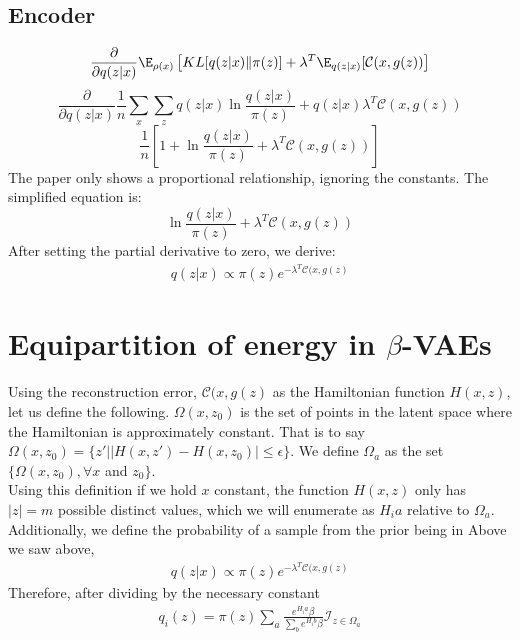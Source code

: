 \subsection*{Encoder}
\setcounter{equation}{0}
\begin{equation}
\frac{\partial}{\partial q(z|x)}\E_{\rho(x)}\left[KL[q(z|x) \| \pi(z)] + \lambda^{T}\E_{q(z|x)}[\mathcal{C}(x, g(z))\right]
\end{equation}
\begin{equation}
\frac{\partial}{\partial q(z|x)} \frac{1}{n}\sum_{x}\sum_{z} q(z|x)\ln{\frac{q(z|x)}{\pi(z)}} + q(z|x)\lambda^{T}\mathcal{C}(x, g(z))
\end{equation}
\begin{equation}
\frac{1}{n}[1 + \ln{\frac{q(z|x)}{\pi(z)}} + \lambda^{T}\mathcal{C}(x, g(z))]
\end{equation}
The paper only shows a proportional relationship, ignoring the constants. The simplified equation is:
\begin{equation}
\ln{\frac{q(z|x)}{\pi(z)}} + \lambda^{T}\mathcal{C}(x, g(z))
\end{equation}
After setting the partial derivative to zero, we derive:
\begin{gather*}
q(z|x) \propto \pi(z)e^{-\lambda^{T}\mathcal{C}(x, g(z)}
\end{gather*}

\section*{Equipartition of energy in $\beta$-VAEs}
Using the reconstruction error, $\mathcal{C}(x, g(z)$ as the Hamiltonian function $H(x,z)$, let us define the following. $\Omega(x,z_0)$ is the set of points in the latent space where the Hamiltonian is approximately constant. That is to say $\Omega(x,z_0) = \{z'||H(x,z')-H(x,z_0)|\leq\epsilon\}$. We define $\Omega_a$ as the set $\{\Omega(x,z_0),\forall x$ and $z_0\}$.\\
Using this definition if we hold $x$ constant, the function $H(x,z)$ only has $|z|=m$ possible distinct values, which we will enumerate as $H_ia$ relative to $\Omega_a$.
Additionally, we define the probability of a sample from the prior being in 
Above we saw above,
\begin{gather*}
q(z|x) \propto \pi(z)e^{-\lambda^{T}\mathcal{C}(x, g(z)}
\end{gather*}
Therefore, after dividing by the necessary constant
\begin{gather*}
q_i(z) = \pi(z)\sum_a\frac{e^{H_ia}{\beta}}{\sum_b e^{H_ib}{\beta}}\mathcal{I}_{z\in\Omega_a}
\end{gather*}




